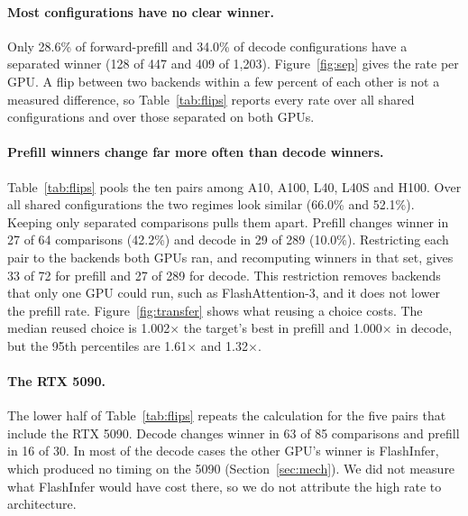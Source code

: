 \documentclass[11pt]{article}
\begin{document}
\paragraph{Most configurations have no clear winner.} Only 28.6\% of
forward-prefill and 34.0\% of decode configurations have a separated winner
(128 of 447 and 409 of 1{,}203). Figure~\ref{fig:sep} gives the rate per GPU.
A flip between two backends within a few percent of each other is not a
measured difference, so Table~\ref{tab:flips} reports every rate over all
shared configurations and over those separated on both GPUs.

\paragraph{Prefill winners change far more often than decode winners.}
Table~\ref{tab:flips} pools the ten pairs among A10, A100, L40, L40S and H100.
Over all shared configurations the two regimes look similar (66.0\% and 52.1\%).
Keeping only separated comparisons pulls them apart. Prefill changes winner in
27 of 64 comparisons (42.2\%) and decode in 29 of 289 (10.0\%). Restricting each
pair to the backends both GPUs ran, and recomputing winners in that set, gives
33 of 72 for prefill and 27 of 289 for decode. This restriction removes
backends that only one GPU could run, such as FlashAttention-3, and it does not
lower the prefill rate. Figure~\ref{fig:transfer} shows what reusing a choice costs.
The median reused choice is 1.002$\times$ the target's best in prefill and
1.000$\times$ in decode, but the 95th percentiles are 1.61$\times$ and
1.32$\times$.

\paragraph{The RTX 5090.} The lower half of Table~\ref{tab:flips} repeats the
calculation for the five pairs that include the RTX 5090. Decode changes winner
in 63 of 85 comparisons and prefill in 16 of 30. In most of the decode cases
the other GPU's winner is FlashInfer, which produced no timing on the 5090
(Section~\ref{sec:mech}). We did not measure what FlashInfer would have cost
there, so we do not attribute the high rate to architecture.
\end{document}
